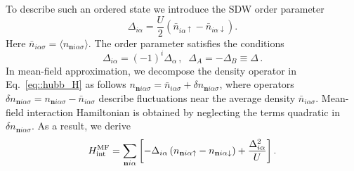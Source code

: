 \documentclass[prb,twocolumn,showpacs,aps,superscriptaddress,floatfix]{revtex4}
\begin{document}
To describe such an ordered state we introduce the SDW order parameter
\begin{equation}
\label{Deltaia}
\Delta_{i\alpha}
=
\frac{U}{2}
\left( \bar{n}_{i\alpha\uparrow} - \bar{n}_{i\alpha\downarrow}\right).
\end{equation}
Here
$\bar{n}_{i\alpha\sigma}=\langle n_{\mathbf{n}i\alpha\sigma}\rangle$.
The order parameter satisfies the conditions
\begin{equation}
\label{eq::sdw_mag}
\Delta_{i\alpha}
=
(-1)^i\Delta_{\alpha}\,,\;\;\Delta_{A}=-\Delta_{B}\equiv\Delta\,.
\end{equation}
In mean-field approximation, we decompose the density operator in
Eq.~\eqref{eq::hubb_H}
as follows
$n_{\mathbf{n}i\alpha\sigma}
=
\bar{n}_{i\alpha\sigma}+\delta n_{\mathbf{n}i\alpha\sigma}$,
where operators
$\delta n_{\mathbf{n}i\alpha\sigma}
=
n_{\mathbf{n}i\alpha\sigma}- \bar{n}_{i\alpha\sigma}$
describe fluctuations near the average density
$\bar{n}_{i\alpha\sigma}$.
Mean-field interaction Hamiltonian is obtained by neglecting the terms
quadratic in
$\delta n_{\mathbf{n}i\alpha\sigma}$.
As a result, we derive
\begin{equation}
\label{UMF}
H_{\text{int}}^{\rm MF}
=
\sum_{\mathbf{n}i\alpha}
	\left[
		-\Delta_{i\alpha}
		\left(
			n_{\mathbf{n}i\alpha\uparrow}
			-
			n_{\mathbf{n}i\alpha\downarrow}
		\right)
		+
		\frac{\Delta_{i\alpha}^2}{U}
	\right].
\end{equation}
\end{document}
